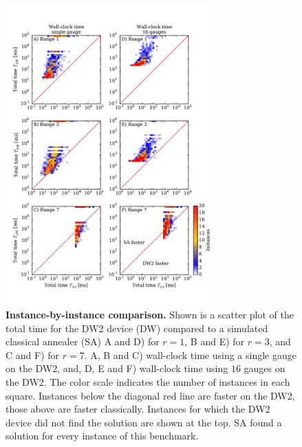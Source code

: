 \begin{figure}
\centering
\includegraphics[width=0.7\textwidth]{sfigures/sfig06_leftover.pdf}
\caption{{\bf Instance-by-instance comparison.} Shown is a scatter plot of the total time for the DW2 device (DW) compared to a simulated classical annealer (SA) A and D) for $r=1$, B and E) for $r=3$, and C and F) for $r=7$.
A, B and C) wall-clock time using a single gauge on the DW2, and, D, E and F)  wall-clock time using $16$ gauges on the DW2.  The color scale indicates the number of instances in each square. Instances below the diagonal red line are faster on the DW2, those above are faster classically.
Instances for which the DW2 device did not find the solution are shown at the top. SA found a solution for every instance of this benchmark.}
\label{fig:ratiosannealingSI}
\end{figure}



